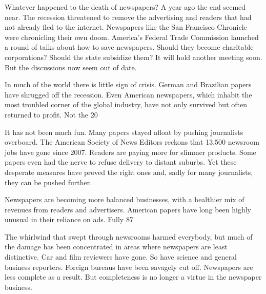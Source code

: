 Whatever happened to the death of newspapers? A year ago the end seemed near. The recession threatened to remove the advertising and readers that had not already fled to the internet. Newspapers like the San Francisco Chronicle were chronicling their own doom. America's Federal Trade Commission launched a round of talks about how to save newspapers. Should they become charitable corporations? Should the state subsidize them? It will hold another meeting soon. But the discussions now seem out of date.


In much of the world there is little sign of crisis. German and Brazilian papers have shrugged off the recession. Even American newspapers, which inhabit the most troubled corner of the global industry, have not only survived but often returned to profit. Not the 20%


It has not been much fun. Many papers stayed afloat by pushing journalists overboard. The American Society of News Editors reckons that 13,500 newsroom jobs have gone since 2007. Readers are paying more for slimmer products. Some papers even had the nerve to refuse delivery to distant suburbs. Yet these desperate measures have proved the right ones and, sadly for many journalists, they can be pushed further.


Newspapers are becoming more balanced businesses, with a healthier mix of revenues from readers and advertisers. American papers have long been highly unusual in their reliance on ads. Fully 87%


The whirlwind that swept through newsrooms harmed everybody, but much of the damage has been concentrated in areas where newspapers are least distinctive. Car and film reviewers have gone. So have science and general business reporters. Foreign bureaus have been savagely cut off. Newspapers are less complete as a result. But completeness is no longer a virtue in the newspaper business.